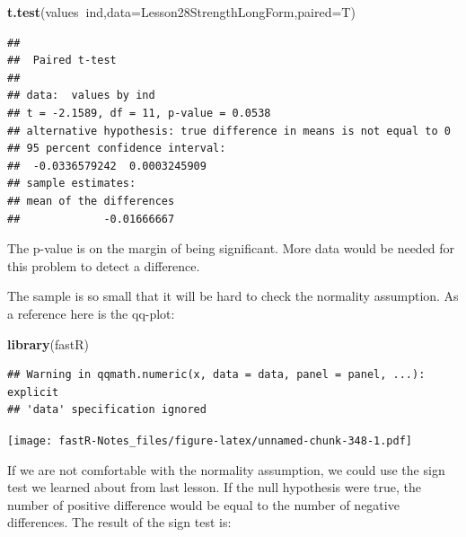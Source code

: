 \documentclass[]{book}
\newenvironment{Shaded}{\begin{snugshade}}{\end{snugshade}}
\newcommand{\KeywordTok}[1]{\textcolor[rgb]{0.13,0.29,0.53}{\textbf{#1}}}
\newcommand{\DataTypeTok}[1]{\textcolor[rgb]{0.13,0.29,0.53}{#1}}
\newcommand{\DecValTok}[1]{\textcolor[rgb]{0.00,0.00,0.81}{#1}}
\newcommand{\OperatorTok}[1]{\textcolor[rgb]{0.81,0.36,0.00}{\textbf{#1}}}
\newcommand{\NormalTok}[1]{#1}
\theoremstyle{definition}
\theoremstyle{definition}
\theoremstyle{definition}
\theoremstyle{remark}
\begin{document}
\begin{Shaded}
\begin{Highlighting}[]
\KeywordTok{t.test}\NormalTok{(values}\OperatorTok{~}\NormalTok{ind,}\DataTypeTok{data=}\NormalTok{Lesson28StrengthLongForm,}\DataTypeTok{paired=}\NormalTok{T)}
\end{Highlighting}
\end{Shaded}

\begin{verbatim}
## 
##  Paired t-test
## 
## data:  values by ind
## t = -2.1589, df = 11, p-value = 0.0538
## alternative hypothesis: true difference in means is not equal to 0
## 95 percent confidence interval:
##  -0.0336579242  0.0003245909
## sample estimates:
## mean of the differences 
##             -0.01666667
\end{verbatim}

The p-value is on the margin of being significant. More data would be
needed for this problem to detect a difference.

The sample is so small that it will be hard to check the normality
assumption. As a reference here is the qq-plot:

\begin{Shaded}
\begin{Highlighting}[]
\KeywordTok{library}\NormalTok{(fastR)}
\end{Highlighting}
\end{Shaded}

\begin{Shaded}
\end{Shaded}

\begin{verbatim}
## Warning in qqmath.numeric(x, data = data, panel = panel, ...): explicit
## 'data' specification ignored
\end{verbatim}

\texttt{[image: fastR-Notes\_files/figure-latex/unnamed-chunk-348-1.pdf]}

If we are not comfortable with the normality assumption, we could use
the sign test we learned about from last lesson. If the null hypothesis
were true, the number of positive difference would be equal to the
number of negative differences. The result of the sign test is:

\begin{Shaded}
\end{Shaded}
\end{document}
